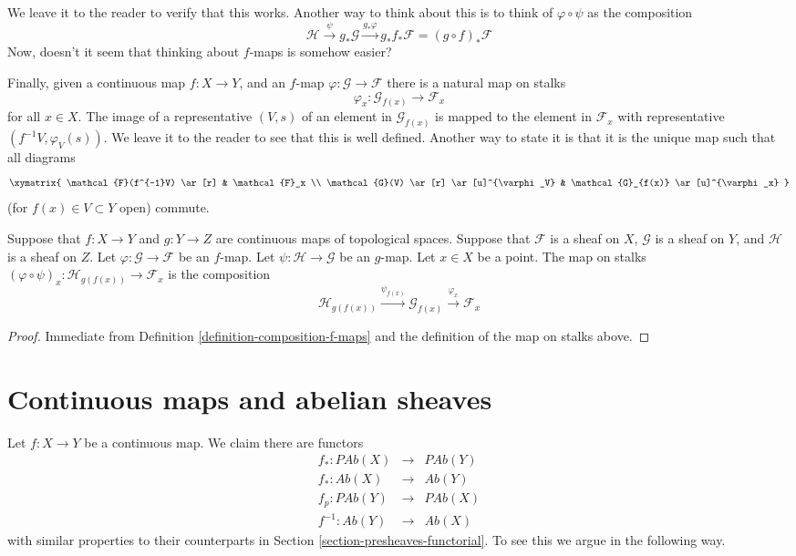 \noindent
We leave it to the reader to verify that this works.
Another way to think about this is to think of
$\varphi \circ \psi$ as the composition
$$
\mathcal{H}
\xrightarrow{\psi}
g_*\mathcal{G}
\xrightarrow{g_*\varphi}
g_* f_* \mathcal{F} = (g \circ f)_* \mathcal{F}
$$
Now, doesn't it seem that thinking about $f$-maps is somehow
easier?

\medskip\noindent
Finally, given a continuous map $f : X \to Y$, and an
$f$-map $\varphi : \mathcal{G} \to \mathcal{F}$ there is
a natural map on stalks
$$
\varphi_x : \mathcal{G}_{f(x)} \longrightarrow \mathcal{F}_x
$$
for all $x \in X$. The image of a representative $(V, s)$
of an element in $\mathcal{G}_{f(x)}$ is mapped to the
element in $\mathcal{F}_x$ with representative $(f^{-1}V,
\varphi_V(s))$. We leave it to the reader to see that this
is well defined. Another way to state it is that it is the
unique map such that all diagrams
$$
\xymatrix{
\mathcal{F}(f^{-1}V) \ar[r] &
\mathcal{F}_x \\
\mathcal{G}(V) \ar[r] \ar[u]^{\varphi_V} &
\mathcal{G}_{f(x)} \ar[u]^{\varphi_x}
}
$$
(for $f(x) \in V \subset Y$ open) commute.

\begin{lemma}
\label{lemma-compose-f-maps-stalks}
Suppose that $f : X \to Y$ and $g : Y \to Z$ are continuous
maps of topological spaces. Suppose that $\mathcal{F}$ is
a sheaf on $X$, $\mathcal{G}$ is a sheaf on $Y$, and
$\mathcal{H}$ is a sheaf on $Z$.
Let $\varphi : \mathcal{G} \to \mathcal{F}$ be an $f$-map.
Let $\psi : \mathcal{H} \to \mathcal{G}$ be an $g$-map.
Let $x \in X$ be a point. The map on stalks
$(\varphi \circ \psi)_x : \mathcal{H}_{g(f(x))}
\to \mathcal{F}_x$ is the composition
$$
\mathcal{H}_{g(f(x))}
\xrightarrow{\psi_{f(x)}}
\mathcal{G}_{f(x)}
\xrightarrow{\varphi_x}
\mathcal{F}_x
$$
\end{lemma}

\begin{proof}
Immediate from Definition \ref{definition-composition-f-maps}
and the definition of the map on stalks above.
\end{proof}



\section{Continuous maps and abelian sheaves}
\label{section-abelian-presheaves-functorial}

\noindent
Let $f : X \to Y$ be a continuous map.
We claim there are functors
\begin{eqnarray*}
f_* : \textit{PAb}(X) & \longrightarrow & \textit{PAb}(Y) \\
f_* : \textit{Ab}(X) & \longrightarrow & \textit{Ab}(Y) \\
f_p : \textit{PAb}(Y) & \longrightarrow & \textit{PAb}(X) \\
f^{-1} : \textit{Ab}(Y) & \longrightarrow & \textit{Ab}(X)
\end{eqnarray*}
with similar properties to their counterparts in
Section \ref{section-presheaves-functorial}.
To see this we argue in the following way.


